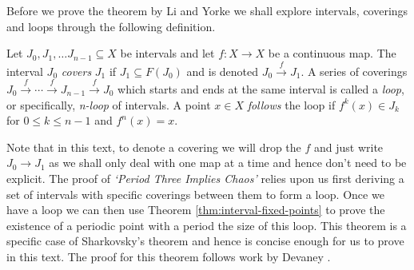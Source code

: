 Before we prove the theorem by Li and Yorke we shall explore intervals, coverings and loops through the following definition.

\begin{defn} \label{defn:covering}
    Let $J_0, J_1, \dots J_{n-1} \subseteq X$ be intervals and let $f: X \to X$ be a continuous map. The interval $J_0$ \emph{covers} $J_1$ if $J_1 \subseteq F(J_0)$ and is denoted $J_0 \xrightarrow{f} J_1$. A series of coverings $J_0 \xrightarrow{f} \cdots \xrightarrow{f} J_{n-1} \xrightarrow{f} J_0$ which starts and ends at the same interval is called a \emph{loop}, or specifically, \emph{n-loop} of intervals. A point $x \in X$ \emph{follows} the loop if $f^k(x) \in J_k$ for $0 \leq k \leq n-1$ and $f^n(x) = x$.
\end{defn}

Note that in this text, to denote a covering we will drop the $f$ and just write $J_0 \to J_1$ as we shall only deal with one map at a time and hence don't need to be explicit. The proof of \emph{`Period Three Implies Chaos'} \cite{li-yorke} relies upon us first deriving a set of intervals with specific coverings between them to form a loop. Once we have a loop we can then use Theorem \ref{thm:interval-fixed-points} to prove the existence of a periodic point with a period the size of this loop. This theorem is a specific case of Sharkovsky's theorem and hence is concise enough for us to prove in this text. The proof for this theorem follows work by Devaney \cite[\S 1.10]{devaney}.

